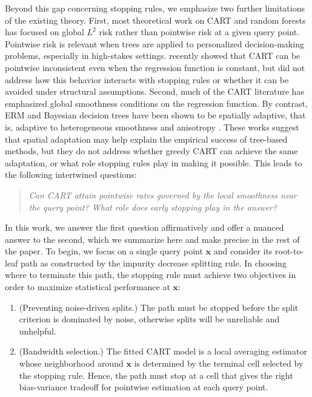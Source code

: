 \documentclass[11pt]{article}
\theoremstyle{plain}
\theoremstyle{definition}
\theoremstyle{remark}
\theoremstyle{plain}
\newcommand{\bx}{\mathbf{x}}
\newcommand{\1}{\mathbbm{1}}
\begin{document}
Beyond this gap concerning stopping rules, we emphasize two further limitations of the existing theory.
First, most theoretical work on CART and random forests has focused on global $L^2$ risk rather than pointwise risk at a given query point. 
Pointwise risk is relevant when trees are applied to personalized decision-making problems, especially in high-stakes settings.
\citet{cattaneo2025honest} recently showed that CART can be pointwise inconsistent even when the regression function is constant, but did not address how this behavior interacts with stopping rules or whether it can be avoided under structural assumptions.
Second, much of the CART literature has emphasized global smoothness conditions on the regression function.
By contrast, ERM and Bayesian decision trees have been shown to be spatially adaptive, that is, adaptive to heterogeneous smoothness and anisotropy \citep{donoho1997cart,xu2026statistical,rovckova2024ideal,jeong2023art}.
These works suggest that spatial adaptation may help explain the empirical success of tree-based methods, but they do not address whether greedy CART can achieve the same adaptation, or what role stopping rules play in making it possible.
This leads to the following intertwined questions:

\begin{quote}
    \emph{Can CART attain pointwise rates governed by the local smoothness near the query point? What role does early stopping play in the answer?} 
\end{quote}

In this work, we answer the first question affirmatively and offer a nuanced answer to the second, which we summarize here and make precise in the rest of the paper.
To begin, we focus on a single query point $\bx$ and consider its root-to-leaf path as constructed by the impurity decrease splitting rule.
In choosing where to terminate this path, the stopping rule must achieve two objectives in order to maximize statistical performance at $\bx$:
\begin{enumerate}
    \item[(a)] (Preventing noise-driven splits.) The path must be stopped before the split criterion is dominated by noise, otherwise splits will be unreliable and unhelpful.
    \item[(b)] (Bandwidth selection.) The fitted CART model is a local averaging estimator whose neighborhood around $\bx$ is determined by the terminal cell selected by the stopping rule.
    Hence, the path must stop at a cell that gives the right bias-variance tradeoff for pointwise estimation at each query point.
\end{enumerate}
\end{document}
